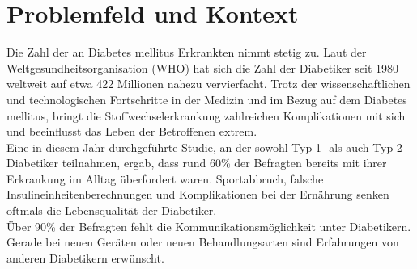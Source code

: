 \documentclass[a4paper, 12pt]{scrartcl}
\begin{document}
			\section{Problemfeld und Kontext}
				Die Zahl der an Diabetes mellitus Erkrankten nimmt stetig zu. Laut der Weltgesundheitsorganisation (WHO) hat sich die Zahl der Diabetiker seit 1980 weltweit auf etwa 422 Millionen nahezu vervierfacht. 
				Trotz der wissenschaftlichen und technologischen Fortschritte in der Medizin und im Bezug auf dem Diabetes mellitus, bringt die Stoffwechselerkrankung zahlreichen Komplikationen mit sich und beeinflusst das Leben der Betroffenen extrem. \\
				Eine in diesem Jahr durchgeführte Studie, an der sowohl Typ-1- als auch Typ-2-Diabetiker teilnahmen, ergab, dass rund 60\% der Befragten bereits mit ihrer Erkrankung im Alltag überfordert waren. Sportabbruch, falsche Insulineinheitenberechnungen und Komplikationen bei der Ernährung senken oftmals die Lebensqualität der Diabetiker. \\
				Über 90\% der Befragten fehlt die Kommunikationsmöglichkeit unter Diabetikern. Gerade bei neuen Geräten oder neuen Behandlungsarten sind Erfahrungen von anderen Diabetikern erwünscht.\\\\				
\end{document}
